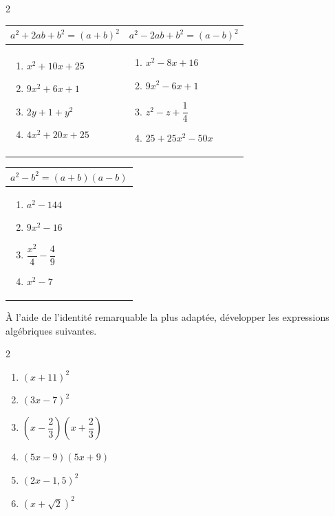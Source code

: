 {\begin{multicols}{2}
\begin{exo}
		  \def\arraystretch{1.5}
		  \begin{tabular}{m{3.5cm}|m{3.5cm}}
			  $a^2 + 2ab + b^2 = (a + b)^2$ & $a^2 - 2ab + b^2 = (a - b)^2$ \\ \hline
			  \begin{enumerate}[label=\alph*)]
				  \item $x^2 + 10x + 25$
				  \item $9x^2 + 6x + 1$
				  \item $2y + 1 + y^2$
				  \item $4x^2 + 20x + 25$
			  \end{enumerate}
			                                &
			  \begin{enumerate}[label=\alph*)]
				  \item $x^2 - 8x + 16$
				  \item $9x^2 - 6x + 1$
				  \item $z^2 - z + \dfrac{1}{4}$
				  \item $25 + 25x^2 - 50x$
			  \end{enumerate}
		  \end{tabular}

		  \begin{center}
			  \begin{tabular}{m{3.8cm}}
				  $a^2 - b^2 = (a + b)(a - b)$ \\ \hline
				  \begin{enumerate}[label=\alph*)]
					  \item $a^2 - 144$
					  \item $9x^2 - 16$
					  \item $\dfrac{x^2}{4} - \dfrac{4}{9}$
					  \item $x^2 - 7$
				  \end{enumerate}
			  \end{tabular}
		  \end{center}
	  \end{exo}

	  \begin{exo}
		  À l'aide de l'identité remarquable la plus adaptée, développer les expressions algébriques suivantes.
		  \vspace*{-2mm}
		  \begin{multicols}{2}
			  \begin{enumerate}[label=\alph*)]
				  \item $(x + 11)^2$
				  \item $(3x - 7)^2$
				  \item $\left( x - \dfrac{2}{3} \right)\left( x + \dfrac{2}{3} \right)$
				  \item $(5x - 9)(5x + 9)$
				  \item $(2x - 1,5)^2$
				  \item $(x + \sqrt{2})^2$
			  \end{enumerate}
		  \end{multicols}
	  \end{exo}


\end{multicols}}
